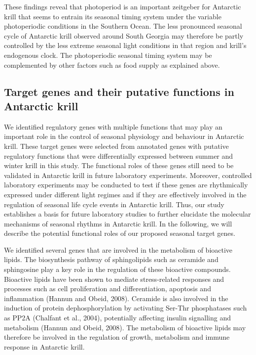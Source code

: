 These findings reveal that photoperiod is an important zeitgeber for Antarctic
krill that seems to entrain its seasonal timing system under the variable
photoperiodic conditions in the Southern Ocean. The less pronounced seasonal
cycle of Antarctic krill observed around South Georgia may therefore be partly
controlled by the less extreme seasonal light conditions in that region and
krill's endogenous clock. The photoperiodic seasonal timing system may be
complemented by other factors such as food supply as explained above.

\subsection*{Target genes and their putative functions in Antarctic krill}

We identified regulatory genes with multiple functions that may play an
important role in the control of seasonal physiology and behaviour in Antarctic
krill. These target genes were selected from annotated genes with putative
regulatory functions that were differentially expressed between summer and
winter krill in this study. The functional roles of these genes still need to
be validated in Antarctic krill in future laboratory experiments. Moreover,
controlled laboratory experiments may be conducted to test if these genes are
rhythmically expressed under different light regimes and if they are
effectively involved in the regulation of seasonal life cycle events in
Antarctic krill. Thus, our study establishes a basis for future laboratory
studies to further elucidate the molecular mechanisms of seasonal rhythms in
Antarctic krill. In the following, we will describe the potential functional
roles of our proposed seasonal target genes. 

We identified several genes that are involved in the metabolism of bioactive
lipids. The biosynthesis pathway of sphingolipids such as ceramide and
sphingosine play a key role in the regulation of these bioactive compounds.
Bioactive lipids have been shown to mediate stress-related responses and
processes such as cell proliferation and differentiation, apoptosis and
inflammation (Hannun and Obeid, 2008). Ceramide is also involved in the
induction of protein dephosphorylation by activating Ser-Thr phosphatases such
as PP2A (Chalfant et al., 2004), potentially affecting insulin signalling and
metabolism (Hannun and Obeid, 2008). The metabolism of bioactive lipids may
therefore be involved in the regulation of growth, metabolism and immune
response in Antarctic krill.

